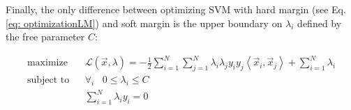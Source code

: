Finally, the only difference between optimizing SVM with hard margin (see Eq. \ref{eq: optimizationLM}) and soft margin is the upper boundary on $\lambda_i$ defined by the free parameter $C$:

\begin{eqnarray}\label{eq: optimizationSoftLM}
 \text{maximize} & & \mathcal{L} (\vec x, \lambda) = -\frac{1}{2}\sum_{i=1}^N\sum_{j=1}^N\lambda_i\lambda_jy_iy_j\left<\vec x_i, \vec x_j\right> + \sum_{i=1}^{N}\lambda_i \\ \nonumber
 \text{subject to} & & \forall_i \hspace{10pt} 0 \leq \lambda_i \leq C \\ \nonumber
 \text{} & & \sum_{i=1}^{N} \lambda_iy_i = 0
\end{eqnarray}
